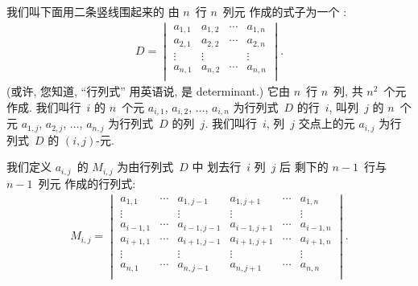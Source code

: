 \documentclass[%
    UTF8,%
    fontset=none,%
    punct=kaiming,%
    zihao=-4,%
    a4paper,%
    oneside,%
]{ctexbook}
\let\emph\relax
\begin{document}
\begin{definition}
    我们叫下面用二条竖线围起来的%
    由 \(n\)~行 \(n\)~列元%
    作成的式子为一个 \emph{\(n\)~级行列式}:
    \begin{align}
        D =
        \begin{vmatrix}
            a_{1,1} & a_{1,2} & \cdots & a_{1,n} \\
            a_{2,1} & a_{2,2} & \cdots & a_{2,n} \\
            \vdots  & \vdots  & {}     & \vdots  \\
            a_{n,1} & a_{n,2} & \cdots & a_{n,n} \\
        \end{vmatrix}.
        \label{eq:C0201}
    \end{align}
    (或许, 您知道, ``行列式'' 用英语说, 是
    determinant.)
    它由 \(n\)~行 \(n\)~列, 共 \(n^2\)~个元作成.
    我们叫行~\(i\) 的 \(n\)~个元
    \(a_{i,1}\), \(a_{i,2}\), \(\dots\), \(a_{i,n}\)
    为行列式~\(D\) 的行~\(i\),
    叫列~\(j\) 的 \(n\)~个元
    \(a_{1,j}\), \(a_{2,j}\), \(\dots\), \(a_{n,j}\)
    为行列式~\(D\) 的列~\(j\).
    我们叫行~\(i\), 列~\(j\) 交点上的元 \(a_{i,j}\)
    为行列式~\(D\) 的 \((i,j)\)-元.

    我们定义 \(a_{i,j}\)~的\emph{余子式} \(M_{i,j}\)
    为由行列式~\(D\) 中%
    划去行~\(i\) 列~\(j\) 后%
    剩下的 \(n-1\)~行与 \(n-1\)~列元%
    作成的行列式:
    \begin{align*}
        M_{i,j} =
        \begin{vmatrix}
            a_{1,1}     & \cdots & a_{1,j-1}   &
            a_{1,j+1}   & \cdots & a_{1,n}       \\
            \vdots      & {}     & \vdots      &
            \vdots      & {}     & \vdots        \\
            a_{i-1,1}   & \cdots & a_{i-1,j-1} &
            a_{i-1,j+1} & \cdots & a_{i-1,n}     \\
            a_{i+1,1}   & \cdots & a_{i+1,j-1} &
            a_{i+1,j+1} & \cdots & a_{i+1,n}     \\
            \vdots      & {}     & \vdots      &
            \vdots      & {}     & \vdots        \\
            a_{n,1}     & \cdots & a_{n,j-1}   &
            a_{n,j+1}   & \cdots & a_{n,n}       \\
        \end{vmatrix}.
    \end{align*}


\end{definition}
\end{document}
